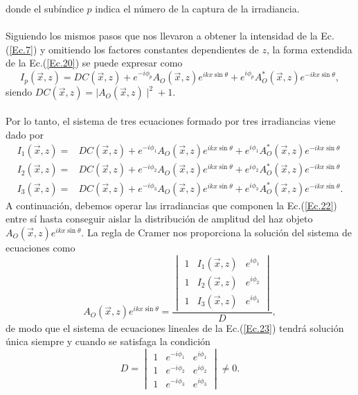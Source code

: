 \documentclass[12pt]{article}
\begin{document}
donde el subíndice $p$ indica el número de la captura de la irradiancia.  \\ \\
Siguiendo los mismos pasos que nos llevaron a obtener la intensidad de la Ec.(\ref{Ec.7}) y omitiendo los factores constantes dependientes de $z$, la forma extendida de la Ec.(\ref{Ec.20}) se puede expresar como
\begin{equation}
   I_p (\Vec{x}, z) = DC (\Vec{x}, z) +  e^{-i \phi_p} A_O (\Vec{x}, z) e^{i k x \sin{\theta}}   + e^{i \phi_p}A_O ^{*}(\Vec{x}, z)e^{-i k x \sin{\theta}},
    \label{Ec.21}
\end{equation}
siendo $DC (\Vec{x}, z) = \mid A_O (\Vec{x}, z) \mid ^{2} + 1 $.\\\\
Por lo tanto,  el sistema de tres ecuaciones formado por tres irradiancias viene dado por
\begin{align}
    I_1 (\Vec{x}, z) = &  DC (\Vec{x}, z) + e^{-i \phi_1} A_O (\Vec{x}, z) e^{i k x \sin{\theta}} + e^{i \phi_1}A_O ^{*}(\Vec{x}, z) e^{-i k x \sin{\theta}} \nonumber \\
    I_2 (\Vec{x}, z) = &  DC (\Vec{x}, z) + e^{-i \phi_2} A_O (\Vec{x}, z) e^{i k x \sin{\theta}}  + e^{i \phi_2} A_O ^{*}(\Vec{x}, z) e^{-i k x \sin{\theta}}\nonumber \\
    I_3 (\Vec{x}, z) = &   DC (\Vec{x}, z) + e^{-i \phi_3}A_O (\Vec{x}, z) e^{i k x \sin{\theta}} + e^{i \phi_3} A_O ^{*}(\Vec{x}, z) e^{-i k x \sin{\theta}}.
    \label{Ec.22}
\end{align}
A continuación, debemos operar las irradiancias que componen la Ec.(\ref{Ec.22}) entre sí hasta conseguir  aislar la distribución de amplitud del  haz objeto $A_O (\Vec{x}, z) e^{i k x \sin{\theta}}$. La regla de Cramer nos proporciona la solución del sistema de ecuaciones como
\begin{equation}
    A_O (\Vec{x}, z) e^{i k x \sin{\theta}} = \frac{  
    \begin{vmatrix}
        1 & I_1(\Vec{x},z) & e^{i \phi_1}\\
        1 & I_2(\Vec{x},z) & e^{i \phi_2}\\
        1 & I_3(\Vec{x},z) & e^{i \phi_3}
    \end{vmatrix}
    }{D},
    \label{Ec.23}
\end{equation}
de modo que el sistema de ecuaciones lineales de la Ec.(\ref{Ec.23}) tendrá solución única siempre y cuando se satisfaga la condición
\begin{equation}
    D =   
    \begin{vmatrix}
        1 & e^{-i \phi_1} & e^{i \phi_1}\\
        1 & e^{-i \phi_2} & e^{i \phi_2}\\
        1 & e^{-i \phi_3}& e^{i \phi_3}
    \end{vmatrix}
    \neq 0.
    \label{Ec.24}
\end{equation}
\end{document}
